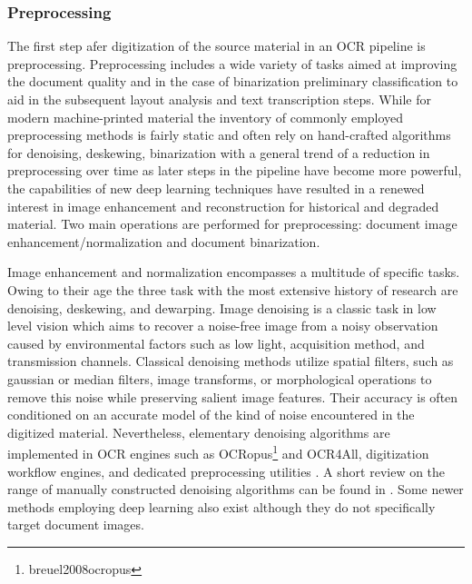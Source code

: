 \subsubsection{Preprocessing}

The first step afer digitization of the source material in an OCR pipeline is
preprocessing. Preprocessing includes a wide variety of tasks aimed at
improving the document quality and in the case of binarization preliminary
classification to aid in the subsequent layout analysis and text transcription
steps. While for modern machine-printed material the inventory of commonly
employed preprocessing methods is fairly static and often rely on hand-crafted
algorithms for denoising, deskewing, binarization with a general trend of a
reduction in preprocessing over time as later steps in the pipeline have become
more powerful, the capabilities of new deep learning techniques have resulted
in a renewed interest in image enhancement and reconstruction for historical
and degraded material. Two main operations are performed for preprocessing:
document image enhancement/normalization and document binarization.

Image enhancement and normalization encompasses a multitude of specific tasks.
Owing to their age the three task with the most extensive history of research
are denoising, deskewing, and dewarping. Image denoising is a classic task in
low level vision which aims to recover a noise-free image from a noisy
observation caused by environmental factors such as low light, acquisition
method, and transmission channels. Classical denoising methods utilize spatial
filters, such as gaussian or median filters, image transforms, or morphological
operations to remove this noise while preserving salient image features. Their
accuracy is often conditioned on an accurate model of the kind of noise
encountered in the digitized material. Nevertheless, elementary denoising
algorithms are implemented in OCR engines such as
OCRopus\footnote{breuel2008ocropus} and OCR4All\cite{reul2019ocr4all},
digitization workflow engines\cite{neudecker2019ocr}, and dedicated
preprocessing utilities \cite{scantailor}. A short review on the range of
manually constructed denoising algorithms can be found in \cite{fan2019brief}.
Some newer methods employing deep learning also exist
\cite{cha2019fully,laine2019high,soltanayev2018training,chen2018image} although
they do not specifically target document images.

